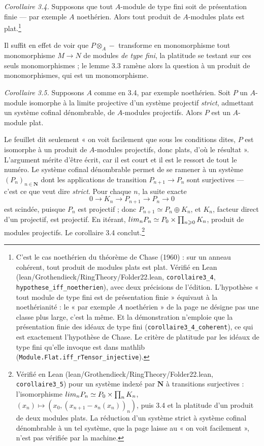 \documentclass[11pt,a4paper]{article}
\begin{document}
\emph{Corollaire 3.4.} Supposons que tout $A$-module de type fini soit de
présentation finie — par exemple $A$ noethérien. Alors tout produit de
$A$-modules plats est plat.\footnote{C'est le cas noethérien du théorème de
Chase (1960) : sur un anneau cohérent, tout produit de modules plats est plat.
Vérifié en Lean (lean/Grothendieck/RingTheory/Folder22.lean, \texttt{corollaire3\_4},
\texttt{hypothese\_iff\_noetherien}), avec deux précisions de l'édition.
L'hypothèse « tout module de type fini est de présentation finie » équivaut à
la noethérianité : le « par exemple $A$ noethérien » de la page ne désigne pas
une classe plus large, c'est la même. Et la démonstration n'emploie que la
présentation finie des idéaux de type fini (\texttt{corollaire3\_4\_coherent}),
ce qui est exactement l'hypothèse de Chase. Le critère de platitude par les
idéaux de type fini qu'elle invoque est dans mathlib
(\texttt{Module.Flat.iff\_rTensor\_injective}).}

Il suffit en effet de voir que $P \otimes_A -$ transforme en monomorphisme tout
monomorphisme $M \to N$ de modules \emph{de type fini}, la platitude se testant
sur ces seuls monomorphismes ; le lemme 3.3 ramène alors la question à un
produit de monomorphismes, qui est un monomorphisme.

\emph{Corollaire 3.5.} Supposons $A$ comme en 3.4, par exemple noethérien. Soit
$P$ un $A$-module isomorphe à la limite projective d'un système projectif
\emph{strict}, admettant un système cofinal dénombrable, de $A$-modules
projectifs. Alors $P$ est un $A$-module plat.

Le feuillet dit seulement « on voit facilement que sous les conditions dites,
$P$ est isomorphe à un produit de $A$-modules projectifs, donc plats, d'où le
résultat ». L'argument mérite d'être écrit, car il est court et il est le
ressort de tout le numéro. Le système cofinal dénombrable permet de se ramener
à un système $(P_n)_{n \in \mathbf{N}}$ dont les applications de transition
$P_{n+1} \to P_n$ sont surjectives — c'est ce que veut dire \emph{strict}. Pour
chaque $n$, la suite exacte
\[
  0 \longrightarrow K_n \longrightarrow P_{n+1} \longrightarrow P_n
  \longrightarrow 0
\]
est scindée, puisque $P_n$ est projectif ; donc $P_{n+1} \simeq P_n \oplus K_n$,
et $K_n$, facteur direct d'un projectif, est projectif. En itérant,
$\varprojlim_n P_n \simeq P_0 \times \prod_{n \geqslant 0} K_n$, produit de
modules projectifs. Le corollaire 3.4 conclut.\footnote{Vérifié en Lean
(lean/Grothendieck/RingTheory/Folder22.lean, \texttt{corollaire3\_5}) pour un système
indexé par $\mathbf{N}$ à transitions surjectives : l'isomorphisme
$\varprojlim_n P_n \simeq P_0 \times \prod_n K_n$, $(x_n) \mapsto (x_0,
(x_{n+1} - s_n(x_n))_n)$, puis 3.4 et la platitude d'un produit de deux
modules plats. La réduction d'un système strict à système cofinal dénombrable
à un tel système, que la page laisse au « on voit facilement », n'est pas
vérifiée par la machine.}
\end{document}
